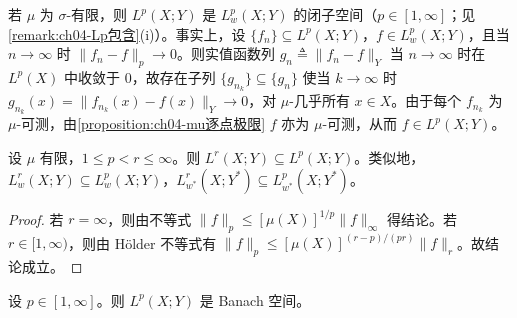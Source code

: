 \documentclass[../../main.tex]{subfiles}%
\begin{document}
\begin{remark}\label{remark:ch04-Lp闭子空间}
若 $\mu$ 为 $\sigma$-有限，则 $L^p(X;Y)$ 是 $L^p_w(X;Y)$ 的闭子空间（$p\in[1,\infty]$；见\cref{remark:ch04-Lp包含}(i)）。事实上，设 $\{f_n\}\subseteq L^p(X;Y)$，$f\in L^p_w(X;Y)$，且当 $n\to\infty$ 时 $\|f_n-f\|_p\to0$。则实值函数列 $g_n\triangleq \|f_n-f\|_Y$ 当 $n\to\infty$ 时在 $L^p(X)$ 中收敛于 $0$，故存在子列 $\{g_{n_k}\}\subseteq\{g_n\}$ 使当 $k\to\infty$ 时 $g_{n_k}(x)=\|f_{n_k}(x)-f(x)\|_Y\to0$，对 $\mu$-几乎所有 $x\in X$。由于每个 $f_{n_k}$ 为 $\mu$-可测，由\cref{proposition:ch04-mu逐点极限} $f$ 亦为 $\mu$-可测，从而 $f\in L^p(X;Y)$。
\end{remark}

\begin{proposition}\label{proposition:ch04-Lp包含阶}
设 $\mu$ 有限，$1\leqslant p<r\leqslant\infty$。则 $L^r(X;Y)\subseteq L^p(X;Y)$。类似地，$L^r_w(X;Y)\subseteq L^p_w(X;Y)$，$L^r_{w^*}(X;Y^*)\subseteq L^p_{w^*}(X;Y^*)$。
\end{proposition}

\begin{proof}
若 $r=\infty$，则由不等式 $\|f\|_p\leqslant[\mu(X)]^{1/p}\|f\|_\infty$ 得结论。若 $r\in[1,\infty)$，则由 Hölder 不等式有 $\|f\|_p\leqslant[\mu(X)]^{(r-p)/(pr)}\|f\|_r$。故结论成立。
\end{proof}

\begin{theorem}\label{theorem:ch04-Lp完备}
设 $p\in[1,\infty]$。则 $L^p(X;Y)$ 是 Banach 空间。
\end{theorem}
\end{document}
